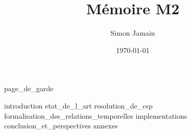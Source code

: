 \documentclass{report}
\title{Mémoire M2}
\author{Simon Jamain}
\date{\today}
\begin{document}
{page_de_garde}

\tableofcontents

{introduction}
{etat_de_l_art}
{resolution_de_csp}
{formalisation_des_relations_temporelles}
{implementations}
{conclusion_et_perspectives}
\appendix
{annexes}
%
%

\printbibliography
\end{document}

